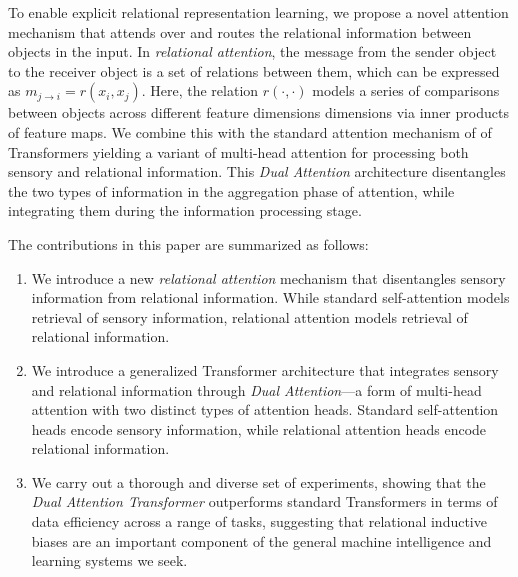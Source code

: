 To enable explicit relational representation learning, we propose a novel attention mechanism that attends over and routes the relational information between objects in the input. In \textit{relational attention}, the message from the sender object to the receiver object is a set of relations between them, which can be expressed as $m_{j \to i} = r(x_i, x_j)$. Here, the relation $r(\cdot, \cdot)$ models a series of comparisons between objects across different feature dimensions dimensions via inner products of feature maps. We combine this with the standard attention mechanism of of Transformers yielding a variant of multi-head attention for processing both sensory and relational information. This \textit{Dual Attention} architecture disentangles the two types of information in the aggregation phase of attention, while integrating them during the information processing stage.

The contributions in this paper are summarized as follows:
\begin{enumerate}
  \item We introduce a new \textit{relational attention} mechanism that disentangles sensory information from relational information. While standard self-attention models retrieval of sensory information, relational attention models retrieval of relational information.
  \item We introduce a generalized Transformer architecture that integrates sensory and relational information through \textit{Dual Attention}---a form of multi-head attention with two distinct types of attention heads. Standard self-attention heads encode sensory information, while relational attention heads encode relational information.
  \item We carry out a thorough and diverse set of experiments, showing that the \textit{Dual Attention Transformer} outperforms standard Transformers in terms of data efficiency across a range of tasks, suggesting that relational inductive biases are an important component of the general machine intelligence and learning systems we seek.
\end{enumerate}

